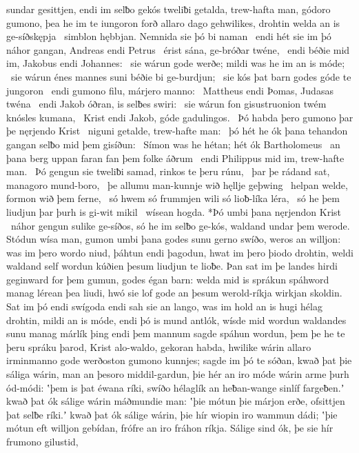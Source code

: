 sundar gesittjen, endi im selƀo gekós
tweliƀi getalda, trew-hafta man,
gódoro gumono, þea he im te iungoron forð
allaro dago gehwilikes, drohtin welda
an is ge-síðskępja \hld\ simblon hębbjan.
Nemnida sie þó bi naman \hld\ endi hét sie im þó náhor gangan,
Andreas endi Petrus \hld\ érist sána,
ge-bróðar twéne, \hld\ endi béðie mid im,
Jakobus endi Johannes: \hld\ sie wárun gode werðe;
mildi was he im an is móde; \hld\ sie wárun énes mannes suni
béðie bi ge-burdjun; \hld\ sie kós þat barn godes
góde te jungoron \hld\ endi gumono filu,
márjero manno: \hld\ Mattheus endi Þomas,
Judasas twéna \hld\ endi Jakob óðran,
is selƀes swiri: \hld\ sie wárun fon gisustruonion twém
knósles kumana, \hld\ Krist endi Jakob,
góde gadulingos. \hld\ Þó habda þero gumono þar
þe nęrjendo Krist \hld\ niguni getalde,
trew-hafte man: \hld\ þó hét he ók þana tehandon gangan
selƀo mid þem gisíðun: \hld\ Símon was he hétan;
hét ók Bartholomeus \hld\ an þana berg uppan
faran fan þem folke áðrum \hld\ endi Philippus mid im,
trew-hafte man. \hld\ Þó gengun sie tweliƀi samad,
rinkos te þeru rúnu, \hld\ þar þe rádand sat,
managoro mund-boro, \hld\ þe allumu man-kunnje
wið hęllje geþwing \hld\ helpan welde,
formon wið þem ferne, \hld\ só hwem só frummjen wili
só lioƀ-líka léra, \hld\ só he þem liudjun þar
þurh is gi-wit mikil \hld\ wísean hogda.
*Þó umbi þana nęrjendon Krist \hld\ náhor gengun
sulike ge-síðos, só he im selƀo ge-kós,
waldand undar þem werode. Stódun wísa man,
gumon umbi þana godes sunu gerno swíðo,
weros an willjon: was im þero wordo niud,
þáhtun endi þagodun, hwat im þero þiodo drohtin,
weldi waldand self wordun kúðien
þesum liudjun te lioƀe. Þan sat im þe landes hirdi
geginward for þem gumun, godes égan barn:
welda mid is sprákun spáhword manag
lérean þea liudi, hwó sie lof gode
an þesum werold-ríkja wirkjan skoldin.
Sat im þó endi swígoda endi sah sie an lango,
was im hold an is hugi hélag drohtin,
mildi an is móde, endi þó is mund antlók,
wísde mid wordun waldandes sunu
manag márlík þing endi þem mannum sagde
spáhun wordun, þem þe he te þeru spráku þarod,
Krist alo-waldo, gekoran habda,
hwilike wárin allaro irminmanno
gode werðoston gumono kunnjes;
sagde im þó te sóðan, kwað þat þie sáliga wárin,
man an þesoro middil-gardun, þie hér an iro móde wárin
arme þurh ód-módi: ʽþem is þat éwana ríki,
swíðo hélaglík an heƀan-wange
sinlíf fargeƀen.ʼ kwað þat ók sálige wárin
máðmundie man: ʽþie mótun þie márjon erðe,
ofsittjen þat selƀe ríki.ʼ kwað þat ók sálige wárin,
þie hír wiopin iro wammun dádi; ʽþie mótun eft willjon gebídan,
frófre an iro fráhon ríkja. Sálige sind ók, þe sie hír frumono gilustid,

